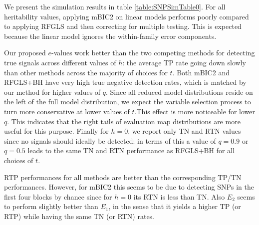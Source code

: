 We present the simulation results in table \ref{table:SNPSimTable0}. For all heritability values, applying mBIC2 on linear models performs poorly compared to applying RFGLS and then correcting for multiple testing. This is expected because the linear model ignores the within-family error components.

Our proposed $e$-values work better than the two competing methods for detecting true signals across different values of $h$: the average TP rate going down slowly than other methods across the majority of choices for $t$. Both mBIC2 and RFGLS+BH have very high true negative detection rates, which is matched by our method for higher values of $q$. Since all reduced model distributions reside on the left of the full model distribution, we expect the variable selection process to turn more conservative at lower values of $t$.This effect is more noticeable for lower $q$. This indicates that the right tails of evaluation map distributions are more useful for this purpose. Finally for $h=0$, we report only TN and RTN values since no signals should ideally be detected: in terms of this a value of $q=0.9$ or $q=0.5$ leads to the same TN and RTN performance as RFGLS+BH for all choices of $t$.

RTP performances for all methods are better than the corresponding TP/TN performances. However, for mBIC2 this seems to be due to detecting SNPs in the first four blocks by chance since for $h=0$ its RTN is less than TN. Also $E_2$ seems to perform slightly better than $E_1$, in the sense that it yields a higher TP (or RTP) while having the same TN (or RTN) rates.

